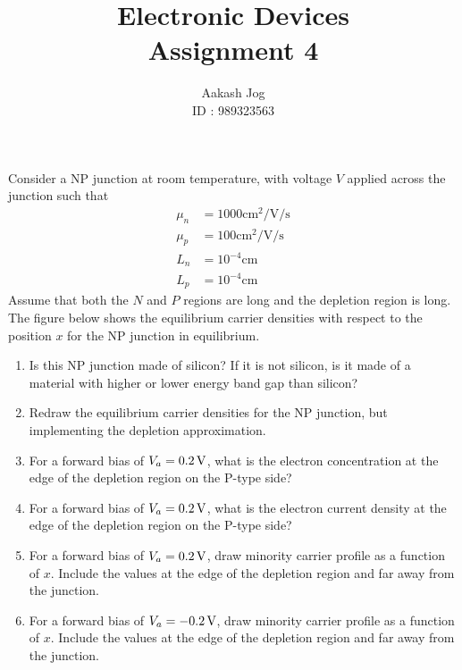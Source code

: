 \documentclass[fleqn, a4paper, 10pt, oneside]{amsart}
\title
[
	Electronic Devices : Assignment 4
]
{
	Electronic Devices\\
	Assignment 4
}
\author
{
	Aakash Jog\\
	ID : 989323563
}
\date{\formatdate{12}{4}{2016}}
\theoremstyle{definition}
\theoremstyle{theorem}
\begin{document}
\maketitle

\begin{question}
	Consider a NP junction at room temperature, with voltage $V$ applied across the junction such that
	\begin{align*}
		\mu_n &= 1000 \si{\centi\metre\squared\per\volt\per\second}\\
		\mu_p &= 100 \si{\centi\metre\squared\per\volt\per\second}\\
		L_n &= 10^{-4} \si{\centi\metre}\\
		L_p &= 10^{-4} \si{\centi\metre}
	\end{align*}
	Assume that both the $N$ and $P$ regions are long and the depletion region is long.
	The figure below shows the equilibrium carrier densities with respect to the position $x$ for the NP junction in equilibrium.
	\begin{enumerate}
		\item
			Is this NP junction made of silicon?
			If it is not silicon, is it made of a material with higher or lower energy band gap than silicon?
		\item
			Redraw the equilibrium carrier densities for the NP junction, but implementing the depletion approximation.
		\item
			For a forward bias of $V_a = 0.2 \volt$, what is the electron concentration at the edge of the depletion region on the P-type side?
		\item
			For a forward bias of $V_a = 0.2 \volt$, what is the electron current density at the edge of the depletion region on the P-type side?
		\item
			For a forward bias of $V_a = 0.2 \volt$, draw minority carrier profile as a function of $x$.
			Include the values at the edge of the depletion region and far away from the junction.
		\item
			For a forward bias of $V_a = -0.2 \volt$, draw minority carrier profile as a function of $x$.
			Include the values at the edge of the depletion region and far away from the junction.
	\end{enumerate}
\end{question}
\end{document}
